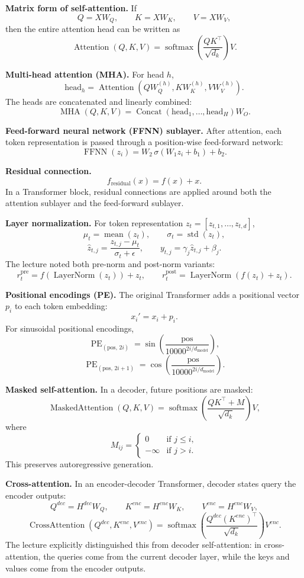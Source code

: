 \documentclass[11pt]{article}
\begin{document}
\textbf{Matrix form of self-attention.} If
\[
Q = X W_Q, \qquad K = X W_K, \qquad V = X W_V,
\]
then the entire attention head can be written as
\[
\operatorname{Attention}(Q,K,V)
= \operatorname{softmax}\!\left(\frac{QK^\top}{\sqrt{d_k}}\right)V.
\]

\textbf{Multi-head attention (MHA).} For head \(h\),
\[
\text{head}_h = \operatorname{Attention}(QW_Q^{(h)}, KW_K^{(h)}, VW_V^{(h)}).
\]
The heads are concatenated and linearly combined:
\[
\operatorname{MHA}(Q,K,V) = \operatorname{Concat}(\text{head}_1,\dots,\text{head}_H)W_O.
\]

\textbf{Feed-forward neural network (FFNN) sublayer.} After attention, each token representation is passed through a position-wise feed-forward network:
\[
\operatorname{FFNN}(z_i) = W_2 \,\sigma(W_1 z_i + b_1) + b_2.
\]

\textbf{Residual connection.}
\[
f_{\text{residual}}(x) = f(x) + x.
\]
In a Transformer block, residual connections are applied around both the attention sublayer and the feed-forward sublayer.

\textbf{Layer normalization.} For token representation \(z_t = [z_{t,1}, \dots, z_{t,d}]\),
\[
\mu_t = \operatorname{mean}(z_t), \qquad \sigma_t = \operatorname{std}(z_t),
\]
\[
\hat{z}_{t,j} = \frac{z_{t,j} - \mu_t}{\sigma_t + \epsilon},
\qquad
y_{t,j} = \gamma_j \hat{z}_{t,j} + \beta_j.
\]
The lecture noted both pre-norm and post-norm variants:
\[
r_t^{\text{pre}} = f(\operatorname{LayerNorm}(z_t)) + z_t,
\qquad
r_t^{\text{post}} = \operatorname{LayerNorm}(f(z_t) + z_t).
\]

\textbf{Positional encodings (PE).} The original Transformer adds a positional vector \(p_i\) to each token embedding:
\[
x_i' = x_i + p_i.
\]
For sinusoidal positional encodings,
\[
\operatorname{PE}_{(\text{pos},\,2i)} =
\sin\!\left(\frac{\text{pos}}{10000^{2i/d_{\text{model}}}}\right),
\]
\[
\operatorname{PE}_{(\text{pos},\,2i+1)} =
\cos\!\left(\frac{\text{pos}}{10000^{2i/d_{\text{model}}}}\right).
\]

\textbf{Masked self-attention.} In a decoder, future positions are masked:
\[
\operatorname{MaskedAttention}(Q,K,V)
= \operatorname{softmax}\!\left(\frac{QK^\top + M}{\sqrt{d_k}}\right)V,
\]
where
\[
M_{ij} =
\begin{cases}
0 & \text{if } j \le i, \\
-\infty & \text{if } j > i.
\end{cases}
\]
This preserves autoregressive generation.

\textbf{Cross-attention.} In an encoder-decoder Transformer, decoder states query the encoder outputs:
\[
Q^{dec} = H^{dec} W_Q, \qquad K^{enc} = H^{enc} W_K, \qquad V^{enc} = H^{enc} W_V,
\]
\[
\operatorname{CrossAttention}(Q^{dec}, K^{enc}, V^{enc})
=
\operatorname{softmax}\!\left(\frac{Q^{dec}(K^{enc})^\top}{\sqrt{d_k}}\right)V^{enc}.
\]
The lecture explicitly distinguished this from decoder self-attention: in cross-attention, the queries come from the current decoder layer, while the keys and values come from the encoder outputs.
\end{document}
